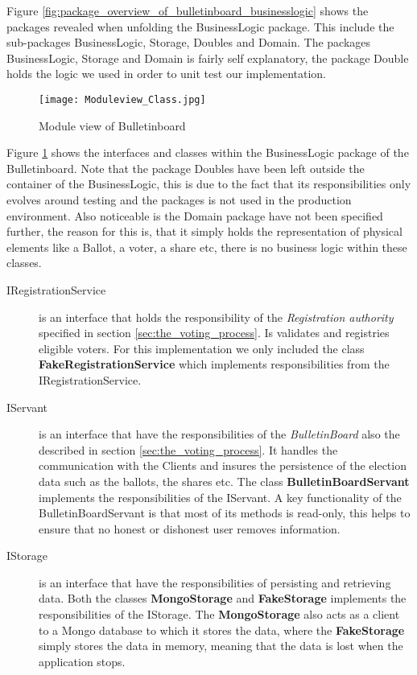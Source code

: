 \noindent
Figure \ref{fig:package_overview_of_bulletinboard_businesslogic} shows the packages revealed when unfolding the BusinessLogic package. This include the sub-packages BusinessLogic, Storage, Doubles and Domain. The packages BusinessLogic, Storage and Domain is fairly self explanatory, the package Double holds the logic we used in order to unit test our implementation. \\


\begin{figure}[H]
    \centering
    \texttt{[image: Moduleview\_Class.jpg]}
    \caption{Module view of Bulletinboard}
    \label{fig:module_over_of_bulletinboar}
\end{figure}

\noindent
Figure \ref{fig:module_over_of_bulletinboar} shows the interfaces and classes within the BusinessLogic package of the Bulletinboard. Note that the package Doubles have been left outside the container of the BusinessLogic, this is due to the fact that its responsibilities only evolves around testing and the packages is not used in the production environment. Also noticeable is the Domain package have not been specified further, the reason for this is, that it simply holds the representation of physical elements like a Ballot, a voter, a share etc, there is no business logic within these classes.

\begin{description}
    \item[IRegistrationService] is an interface that holds the responsibility of the \textit{Registration authority} specified in section \ref{sec:the_voting_process}. Is validates and registries eligible voters.  For this implementation we only included the class \textbf{FakeRegistrationService} which implements responsibilities from the IRegistrationService. 
    
    \item[IServant] is an interface that have the responsibilities of the \textit{BulletinBoard} also the described in section \ref{sec:the_voting_process}. It handles the communication with the Clients and insures the persistence of the election data such as the ballots, the shares etc. The class \textbf{BulletinBoardServant} implements the responsibilities of the IServant. A key functionality of the BulletinBoardServant is that most of its methods is read-only, this helps to ensure that no honest or dishonest user removes information. 
    
    \item[IStorage] is an interface that have the responsibilities of persisting and retrieving data. Both the classes \textbf{MongoStorage} and \textbf{FakeStorage} implements the responsibilities of the IStorage. The \textbf{MongoStorage} also acts as a client to a Mongo database to which it stores the data, where the \textbf{FakeStorage} simply stores the data in memory, meaning that the data is lost when the application stops. 
    
\end{description}

